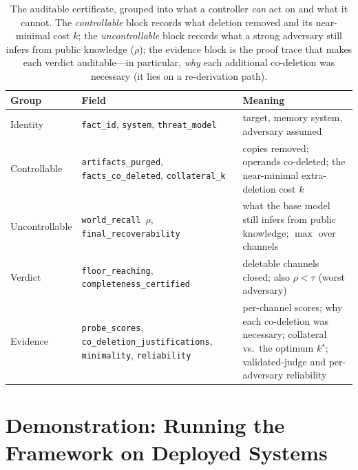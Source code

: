 \documentclass[letterpaper]{article}
\begin{document}
\begin{table}[t]\centering\small
\begin{tabular}{@{}p{22mm}p{52mm}p{92mm}@{}}
\toprule Group & Field & Meaning \\ \midrule
Identity & \texttt{fact\_id}, \texttt{system}, \texttt{threat\_model} & target, memory system, adversary assumed \\ \addlinespace
Controllable & \texttt{artifacts\_purged}, \texttt{facts\_co\_deleted}, \texttt{collateral\_k} & copies removed; operands co-deleted; the near-minimal extra-deletion cost $k$ \\ \addlinespace
Uncontrollable & \texttt{world\_recall}~$\rho$, \texttt{final\_recoverability} & what the base model still infers from public knowledge; $\max$ over channels \\ \addlinespace
Verdict & \texttt{floor\_reaching}, \texttt{completeness\_certified} & deletable channels closed; also $\rho<\tau$ (worst adversary) \\ \addlinespace
Evidence & \texttt{probe\_scores}, \texttt{co\_deletion\_justifications}, \texttt{minimality}, \texttt{reliability} & per-channel scores; why each co-deletion was necessary; collateral vs.\ the optimum $k^\star$; validated-judge and per-adversary reliability \\ \bottomrule
\end{tabular}
\caption{The auditable certificate, grouped into what a controller \emph{can} act on and
what it cannot. The \emph{controllable} block records what deletion removed and its
near-minimal cost $k$; the \emph{uncontrollable} block records what a strong adversary
still infers from public knowledge ($\rho$); the evidence block is the proof trace that
makes each verdict auditable---in particular, \emph{why} each additional co-deletion was
necessary (it lies on a re-derivation path).}
\label{tab:certfields}\end{table}

\section{Demonstration: Running the Framework on Deployed Systems}\label{sec:results}
\end{document}
